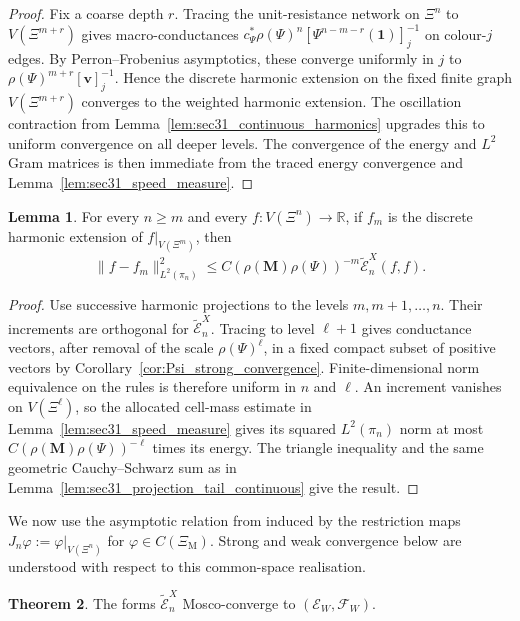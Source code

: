\documentclass{article}
\theoremstyle{plain}
\theoremstyle{definition}
\newtheorem{theorem}{Theorem}[section]
\newtheorem{lemma}[theorem]{Lemma}
\begin{document}
\begin{proof}
Fix a coarse depth $r$.
Tracing the unit-resistance network on $\Xi^n$ to $V(\Xi^{m+r})$ gives macro-conductances $c_\Psi^*\rho(\Psi)^n[\Psi^{n-m-r}(\mathbf 1)]_j^{-1}$ on colour-$j$ edges.
By Perron--Frobenius asymptotics, these converge uniformly in $j$ to $\rho(\Psi)^{m+r}[\mathbf v]_j^{-1}$.
Hence the discrete harmonic extension on the fixed finite graph $V(\Xi^{m+r})$ converges to the weighted harmonic extension.
The oscillation contraction from Lemma~\ref{lem:sec31_continuous_harmonics} upgrades this to uniform convergence on all deeper levels.
The convergence of the energy and $L^2$ Gram matrices is then immediate from the traced energy convergence and Lemma~\ref{lem:sec31_speed_measure}.
\end{proof}

\begin{lemma}\label{lem:sec31_projection_tail_discrete}
For every $n\ge m$ and every $f:V(\Xi^n)\to\mathbb R$, if $f_m$ is the discrete harmonic extension of $f|_{V(\Xi^m)}$, then
\[
\|f-f_m\|_{L^2(\pi_n)}^2
\le
C(\rho(\mathbf M)\rho(\Psi))^{-m}\widetilde{\mathcal E}_n^{X}(f,f).
\]
\end{lemma}

\begingroup\color{red}
\begin{proof}
Use successive harmonic projections to the levels $m,m+1,\ldots,n$.
Their increments are orthogonal for $\widetilde{\mathcal E}_n^X$.
Tracing to level $\ell+1$ gives conductance vectors, after removal of
the scale $\rho(\Psi)^\ell$, in a fixed compact subset of positive
vectors by Corollary~\ref{cor:Psi_strong_convergence}.
Finite-dimensional norm equivalence on the rules is therefore uniform
in $n$ and $\ell$. An increment vanishes on $V(\Xi^\ell)$, so the
allocated cell-mass estimate in Lemma~\ref{lem:sec31_speed_measure} gives
its squared $L^2(\pi_n)$ norm at most
$C(\rho(\mathbf M)\rho(\Psi))^{-\ell}$ times its energy.
The triangle inequality and the same geometric Cauchy--Schwarz sum as
in Lemma~\ref{lem:sec31_projection_tail_continuous} give the result.
\end{proof}
\endgroup{}


We now use the asymptotic relation from \cite{kuwae2003convergence} induced by the restriction maps $J_n\varphi:=\varphi|_{V(\Xi^n)}$ for $\varphi\in C(\Xi_{\mathrm M})$.
Strong and weak convergence below are understood with respect to this common-space realisation.

\begin{theorem}\label{thm:sec31_mosco}
The forms $\widetilde{\mathcal E}_n^{X}$ Mosco-converge to $(\mathcal E_W,\mathcal F_W)$.
\end{theorem}
\end{document}
